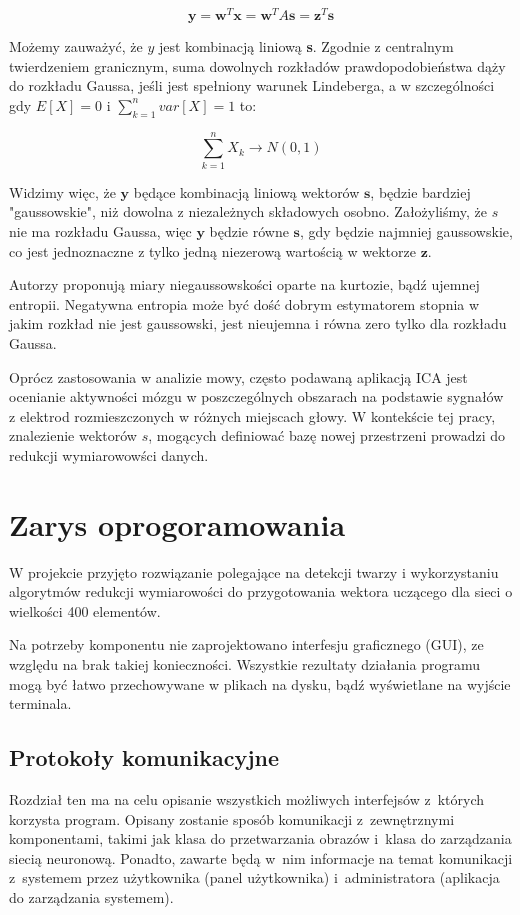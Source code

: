 \documentclass[oneside, eng]{mgr}
\newcommand{\bb}{\textbf}
\begin{document}
\begin{equation}
	\bb{y} = \bb{w}^T \bb{x} = \bb{w}^T A \bb{s} = \bb{z}^T \bb{s} 
\end{equation}

Możemy zauważyć, że $y$ jest kombinacją liniową \bb{s}. Zgodnie z centralnym twierdzeniem granicznym, suma dowolnych rozkładów prawdopodobieństwa dąży do rozkładu Gaussa, jeśli jest spełniony warunek Lindeberga, a w szczególności gdy $E[X] = 0$ i $\sum_{k=1}^{n}var[X] = 1$ to:

\begin{equation}
	\sum_{k=1}^{n} X_k \to N(0,1)
\end{equation}

Widzimy więc, że $\bb{y}$ będące kombinacją liniową wektorów $\bb{s}$, będzie bardziej "gaussowskie", niż dowolna z niezależnych składowych osobno. Założyliśmy, że $s$ nie ma rozkładu Gaussa, więc $\bb{y}$ będzie równe $\bb{s}$, gdy będzie najmniej gaussowskie, co jest jednoznaczne z tylko jedną niezerową wartością w wektorze $\bb{z}$.

Autorzy \cite{ICA} proponują miary niegaussowskości oparte na kurtozie, bądź ujemnej entropii. Negatywna entropia może być dość dobrym estymatorem stopnia w jakim rozkład nie jest gaussowski, jest nieujemna i równa zero tylko dla rozkładu Gaussa.


Oprócz zastosowania w analizie mowy, często podawaną aplikacją ICA jest ocenianie aktywności mózgu w poszczególnych obszarach na podstawie sygnałów z elektrod rozmieszczonych w różnych miejscach głowy. W kontekście tej pracy, znalezienie wektorów $s$, mogących definiować bazę nowej przestrzeni prowadzi do redukcji wymiarowowści danych.

\newpage


\chapter{Zarys oprogoramowania}


W projekcie przyjęto rozwiązanie polegające na detekcji twarzy i wykorzystaniu algorytmów redukcji wymiarowości do przygotowania wektora uczącego dla sieci o wielkości 400 elementów.


Na potrzeby komponentu nie zaprojektowano interfesju graficznego (GUI), ze względu na brak takiej konieczności. Wszystkie rezultaty działania programu mogą być łatwo przechowywane w plikach na dysku, bądź wyświetlane na wyjście terminala. 


\section{Protokoły komunikacyjne}
Rozdział ten ma na celu opisanie wszystkich możliwych interfejsów z~których korzysta
program. Opisany zostanie sposób komunikacji z~zewnętrznymi komponentami, takimi jak
klasa do przetwarzania obrazów i~klasa do zarządzania siecią neuronową.
Ponadto, zawarte będą w~nim informacje na temat komunikacji z~systemem przez
użytkownika (panel użytkownika) i~administratora (aplikacja do zarządzania systemem).
\end{document}
